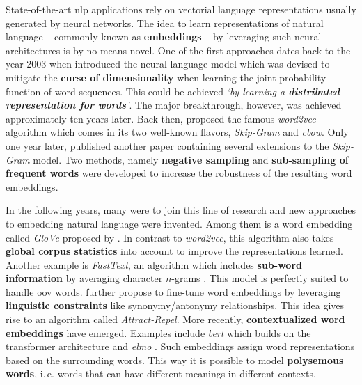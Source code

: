  State-of-the-art \gls{nlp} applications rely on vectorial language representations usually generated by neural networks. The idea to learn representations of natural language -- commonly known as \textbf{embeddings} -- by leveraging such neural architectures is by no means novel. One of the first approaches dates back to the year 2003 when \citep{Bengio.2003} introduced the neural language model which was devised to mitigate the \textbf{curse of dimensionality} when learning the joint probability function of word sequences. This could be achieved \textit{`by learning a \textbf{distributed representation for words}'}. The major breakthrough, however, was achieved approximately ten years later. Back then, \citep{Mikolov.2013a} proposed the famous \textit{word2vec} algorithm which comes in its two well-known flavors, \textit{Skip-Gram} and \textit{\gls{cbow}}. Only one year later, \citep{Le.2014} published another paper containing several extensions to the \textit{Skip-Gram} model. Two methods, namely \textbf{negative sampling} and \textbf{sub-sampling of frequent words} were developed to increase the robustness of the resulting word embeddings.

In the following years, many were to join this line of research and new approaches to embedding natural language were invented. Among them is a word  embedding called \textit{GloVe} proposed by \citep{Pennington.2014}. In contrast to \textit{word2vec}, this algorithm also takes \textbf{global corpus statistics} into account to improve the representations learned. Another example is \textit{FastText}, an algorithm which includes \textbf{sub-word information} by averaging character $n$-grams \citep{Bojanowski.2017}. This model is perfectly suited to handle \gls{oov} words. \citep{Mrksic.2017} further propose to fine-tune word embeddings by leveraging \textbf{linguistic constraints} like synonymy/antonymy relationships. This idea gives rise to an algorithm called \textit{Attract-Repel}. More recently, \textbf{contextualized word embeddings} have emerged. Examples include \textit{\gls{bert}} \citep{Devlin.2018} which builds on the transformer architecture \citep{Vaswani.2017} and \textit{\gls{elmo}} \citep{Peters.2018}. Such embeddings assign word representations based on the surrounding words. This way it is possible to model \textbf{polysemous words}, i.\,e. words that can have different meanings in different contexts.

